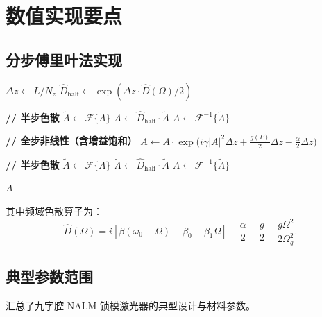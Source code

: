 \documentclass[11pt,a4paper]{ctexart}
\begin{document}
\section{数值实现要点}
\label{sec:numerical}

\subsection{分步傅里叶法实现}

\begin{algorithm}[htbp]
\caption{对称分步傅里叶法（SSFM）}
\label{alg:SSFM}
\begin{algorithmic}[1]
  \State $\Delta z \gets L / N_z$
  \State $\hat{D}_{\text{half}} \gets \exp(\Delta z \cdot \hat{D}(\Omega) / 2)$

    \State \textbf{// 半步色散}
    \State $\tilde{A} \gets \mathcal{F}\{A\}$
    \State $\tilde{A} \gets \hat{D}_{\text{half}} \cdot \tilde{A}$
    \State $A \gets \mathcal{F}^{-1}\{\tilde{A}\}$

    \State \textbf{// 全步非线性（含增益饱和）}
    \State $A \gets A \cdot \exp\!\big(i\gamma|A|^2\Delta z
           + \frac{g(P)}{2}\Delta z - \frac{\alpha}{2}\Delta z\big)$

    \State \textbf{// 半步色散}
    \State $\tilde{A} \gets \mathcal{F}\{A\}$
    \State $\tilde{A} \gets \hat{D}_{\text{half}} \cdot \tilde{A}$
    \State $A \gets \mathcal{F}^{-1}\{\tilde{A}\}$
  \EndFor

  \State \Return $A$
\EndFunction
\end{algorithmic}
\end{algorithm}

其中频域色散算子为：
\begin{equation}
  \hat{D}(\Omega) = i[\beta(\omega_0+\Omega) - \beta_0 - \beta_1\Omega]
                  - \frac{\alpha}{2}
                  + \frac{g}{2} - \frac{g\Omega^2}{2\Omega_g^2}.
  \label{eq:D_operator_full}
\end{equation}

\subsection{典型参数范围}

 汇总了九字腔 NALM 锁模激光器的典型设计与材料参数。
\end{document}
